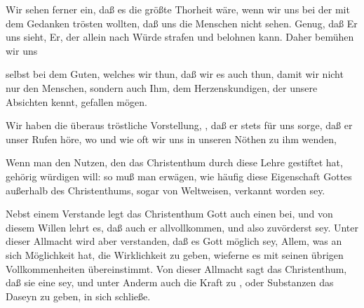\begin{aufza}
\begin{aufzb}
\item Wir sehen ferner ein, daß es die größte Thorheit wäre, wenn wir uns bei der  mit dem Gedanken trösten wollten, daß uns die Menschen nicht sehen. Genug, daß Er uns sieht, Er, der allein nach Würde strafen und belohnen kann. Daher bemühen wir uns
\item selbst bei dem Guten, welches wir thun, daß wir es
auch  thun, damit wir nicht nur den Menschen, sondern auch Ihm, dem Herzenskundigen, der unsere Absichten kennt, gefallen mögen.~
\end{aufzb}
\item Wir haben die überaus tröstliche Vorstellung, , daß er stets für uns sorge, daß er unser Rufen höre, wo und wie oft wir uns in unseren Nöthen zu ihm wenden, \usw\
\end{aufza}

Wenn man den Nutzen, den das Christenthum durch diese Lehre gestiftet hat, gehörig würdigen will: so muß man erwägen, wie häufig diese Eigenschaft Gottes außerhalb des Christenthums, sogar von Weltweisen, verkannt worden sey.

Nebst einem Verstande legt das Christenthum Gott auch einen \RWbet{Willen} bei, und von diesem Willen lehrt es, daß auch er allvollkommen, und also zuvörderst  sey. Unter dieser Allmacht wird aber verstanden, daß es Gott möglich sey, Allem, was an sich Möglichkeit hat, die Wirklichkeit zu geben, wieferne es mit seinen übrigen Vollkommenheiten übereinstimmt. Von dieser Allmacht sagt das Christenthum, daß sie eine  sey, und unter Anderm auch die Kraft zu , oder Substanzen das Daseyn zu geben, in sich schließe.

